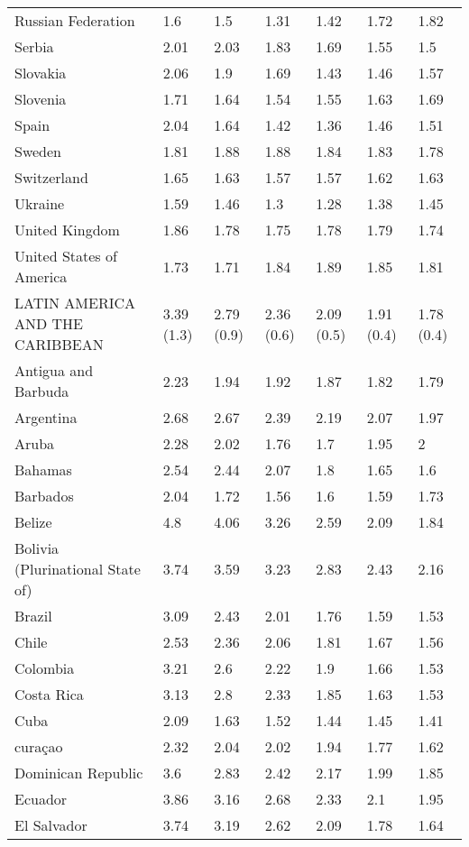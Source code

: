 \begin{longtable}[t]{lllllll}
Russian Federation & 1.6 & 1.5 & 1.31 & 1.42 & 1.72 & 1.82\\
Serbia & 2.01 & 2.03 & 1.83 & 1.69 & 1.55 & 1.5\\
Slovakia & 2.06 & 1.9 & 1.69 & 1.43 & 1.46 & 1.57\\
Slovenia & 1.71 & 1.64 & 1.54 & 1.55 & 1.63 & 1.69\\
Spain & 2.04 & 1.64 & 1.42 & 1.36 & 1.46 & 1.51\\
Sweden & 1.81 & 1.88 & 1.88 & 1.84 & 1.83 & 1.78\\
Switzerland & 1.65 & 1.63 & 1.57 & 1.57 & 1.62 & 1.63\\
Ukraine & 1.59 & 1.46 & 1.3 & 1.28 & 1.38 & 1.45\\
United Kingdom & 1.86 & 1.78 & 1.75 & 1.78 & 1.79 & 1.74\\
United States of America & 1.73 & 1.71 & 1.84 & 1.89 & 1.85 & 1.81\\
LATIN AMERICA AND THE CARIBBEAN & 3.39 (1.3) & 2.79 (0.9) & 2.36 (0.6) & 2.09 (0.5) & 1.91 (0.4) & 1.78 (0.4)\\
Antigua and Barbuda & 2.23 & 1.94 & 1.92 & 1.87 & 1.82 & 1.79\\
Argentina & 2.68 & 2.67 & 2.39 & 2.19 & 2.07 & 1.97\\
Aruba & 2.28 & 2.02 & 1.76 & 1.7 & 1.95 & 2\\
Bahamas & 2.54 & 2.44 & 2.07 & 1.8 & 1.65 & 1.6\\
Barbados & 2.04 & 1.72 & 1.56 & 1.6 & 1.59 & 1.73\\
Belize & 4.8 & 4.06 & 3.26 & 2.59 & 2.09 & 1.84\\
Bolivia (Plurinational State of) & 3.74 & 3.59 & 3.23 & 2.83 & 2.43 & 2.16\\
Brazil & 3.09 & 2.43 & 2.01 & 1.76 & 1.59 & 1.53\\
Chile & 2.53 & 2.36 & 2.06 & 1.81 & 1.67 & 1.56\\
Colombia & 3.21 & 2.6 & 2.22 & 1.9 & 1.66 & 1.53\\
Costa Rica & 3.13 & 2.8 & 2.33 & 1.85 & 1.63 & 1.53\\
Cuba & 2.09 & 1.63 & 1.52 & 1.44 & 1.45 & 1.41\\
curaçao & 2.32 & 2.04 & 2.02 & 1.94 & 1.77 & 1.62\\
Dominican Republic & 3.6 & 2.83 & 2.42 & 2.17 & 1.99 & 1.85\\
Ecuador & 3.86 & 3.16 & 2.68 & 2.33 & 2.1 & 1.95\\
El Salvador & 3.74 & 3.19 & 2.62 & 2.09 & 1.78 & 1.64\\

\end{longtable}
